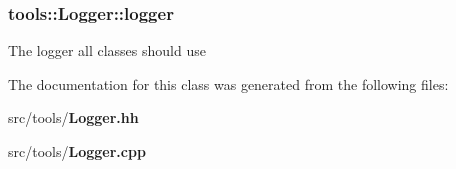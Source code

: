 \subsubsection[{logger}]{ tools\-::\-Logger\-::logger\hspace{0.3cm}{\ttfamily [static]}}\label{classtools_1_1Logger_a341eaab3865b60362db6736c2e2b7c68}
The logger all classes should use 

The documentation for this class was generated from the following files\-:\begin{DoxyCompactItemize}
\item 
src/tools/{\bf Logger.\-hh}\item 
src/tools/{\bf Logger.\-cpp}\end{DoxyCompactItemize}
